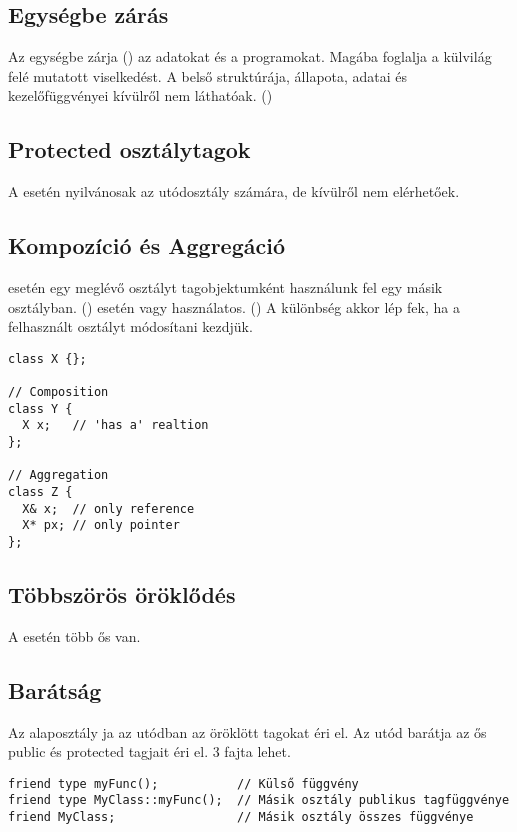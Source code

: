 \documentclass[../../main.tex]{subfiles}
\begin{document}
\subsection{Egységbe zárás}

Az  egységbe zárja () az adatokat és a programokat.
Magába foglalja a külvilág felé mutatott viselkedést. A belső struktúrája,
állapota, adatai és kezelőfüggvényei kívülről nem láthatóak. ()

\subsection{Protected osztálytagok}

A    esetén nyilvánosak az
utódosztály számára, de kívülről nem elérhetőek.

\subsection{Kompozíció és Aggregáció}

 esetén egy meglévő osztályt tagobjektumként használunk fel egy
másik osztályban. ()  esetén
 vagy  használatos. ()
A különbség akkor lép fek, ha a felhasznált osztályt módosítani kezdjük.

\begin{verbatim}
class X {};

// Composition
class Y {
  X x;   // 'has a' realtion
};

// Aggregation
class Z {
  X& x;  // only reference
  X* px; // only pointer
};
\end{verbatim}

\subsection{Többszörös öröklődés}

A  esetén több ős van.

\subsection{Barátság}

Az alaposztály ja az utódban az öröklött tagokat éri el.
Az utód barátja az ős public és protected tagjait éri el. 3 fajta
 lehet.

\begin{verbatim}
friend type myFunc();           // Külső függvény
friend type MyClass::myFunc();  // Másik osztály publikus tagfüggvénye
friend MyClass;                 // Másik osztály összes függvénye
\end{verbatim}
\end{document}

